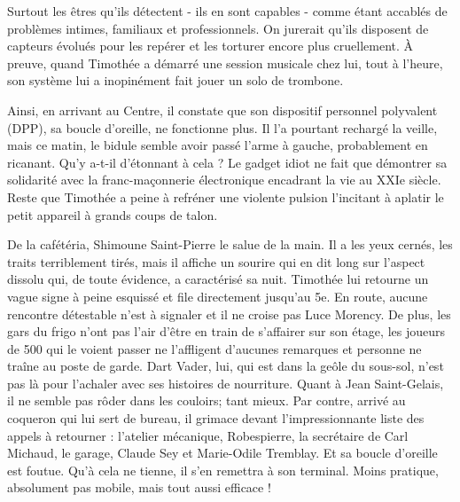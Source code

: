 
Surtout les êtres qu’ils détectent - ils en sont capables - comme étant accablés de problèmes intimes, familiaux et professionnels. On jurerait qu’ils disposent de capteurs évolués pour les repérer et les torturer encore plus cruellement. À preuve, quand Timothée a démarré une session musicale chez lui, tout à l’heure, son système lui a inopinément fait jouer un solo de trombone.

Ainsi, en arrivant au Centre, il constate que son dispositif personnel polyvalent (DPP), sa boucle d’oreille, ne fonctionne plus. Il l’a pourtant rechargé la veille, mais ce matin, le bidule semble avoir passé l’arme à gauche, probablement en ricanant. Qu’y a-t-il d’étonnant à cela ? Le gadget idiot ne fait que démontrer sa solidarité avec la franc-maçonnerie électronique encadrant la vie au XXIe siècle. Reste que Timothée a peine à refréner une violente pulsion l’incitant à aplatir le petit appareil à grands coups de talon.

De la cafétéria, Shimoune Saint-Pierre le salue de la main. Il a les yeux cernés, les traits terriblement tirés, mais il affiche un sourire qui en dit long sur l’aspect dissolu qui, de toute évidence, a caractérisé sa nuit. Timothée lui retourne un vague signe à peine esquissé et file directement jusqu’au 5e. En route, aucune rencontre détestable n’est à signaler et il ne croise pas Luce Morency. De plus, les gars du frigo n’ont pas l’air d’être en train de s’affairer sur son étage, les joueurs de 500 qui le voient passer ne l’affligent d’aucunes remarques et personne ne traîne au poste de garde. Dart Vader, lui, qui est dans la geôle du sous-sol, n’est pas là pour l’achaler avec ses histoires de nourriture. Quant à Jean Saint-Gelais, il ne semble pas rôder dans les couloirs; tant mieux. Par contre, arrivé au coqueron qui lui sert de bureau, il grimace devant l’impressionnante liste des appels à retourner : l’atelier mécanique, Robespierre, la secrétaire de Carl Michaud, le garage, Claude Sey et Marie-Odile Tremblay. Et sa boucle d’oreille est foutue. Qu’à cela ne tienne, il s’en remettra à son terminal. Moins pratique, absolument pas mobile, mais tout aussi efficace !

